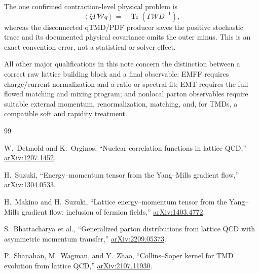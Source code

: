 \documentclass[11pt,a4paper]{article}
\numberwithin{equation}{section}
\newcommand{\Tr}{\operatorname{Tr}}
\newcommand{\avg}[1]{\left\langle #1\right\rangle}
\newcommand{\cW}{\mathcal{W}}
\begin{document}
The one confirmed contraction-level physical problem is
\begin{equation}
 \avg{\bar q\Gamma\cW q}
 =-\Tr(\Gamma\cW D^{-1}),
\end{equation}
whereas the disconnected qTMD/PDF producer saves the positive stochastic
trace and its documented physical covariance omits the outer minus.  This is
an exact convention error, not a statistical or solver effect.

All other major qualifications in this note concern the distinction between
a correct raw lattice building block and a final observable: EMFF requires
charge/current normalization and a ratio or spectral fit; EMT requires the
full flowed matching and mixing program; and nonlocal parton observables
require suitable external momentum, renormalization, matching, and, for TMDs,
a compatible soft and rapidity treatment.

\begin{thebibliography}{99}

W.~Detmold and K.~Orginos,
``Nuclear correlation functions in lattice QCD,''
\href{https://arxiv.org/abs/1207.1452}{arXiv:1207.1452}.

H.~Suzuki,
``Energy--momentum tensor from the Yang--Mills gradient flow,''
\href{https://arxiv.org/abs/1304.0533}{arXiv:1304.0533}.

H.~Makino and H.~Suzuki,
``Lattice energy--momentum tensor from the Yang--Mills gradient flow:
inclusion of fermion fields,''
\href{https://arxiv.org/abs/1403.4772}{arXiv:1403.4772}.

S.~Bhattacharya et al.,
``Generalized parton distributions from lattice QCD with asymmetric
momentum transfer,''
\href{https://arxiv.org/abs/2209.05373}{arXiv:2209.05373}.

P.~Shanahan, M.~Wagman, and Y.~Zhao,
``Collins--Soper kernel for TMD evolution from lattice QCD,''
\href{https://arxiv.org/abs/2107.11930}{arXiv:2107.11930}.

\end{thebibliography}
\end{document}
